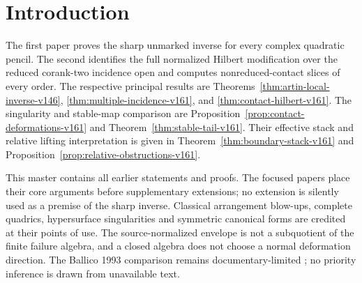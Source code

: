 \begin{abstract}
We prove that an unmarked, ungraded finite local algebra associated
with a complex quadratic pencil determines the pencil up to congruence.
The truncation order $n^2+2n-4$ is sharp, and no regularity assumption
is imposed. Multiplication recovers the first relation, its determinant
rulings, and the orientation that identifies the pencil coefficient
line. The construction extends to families over arbitrary complex
bases. On the effectively rigidified failure stack, the recovered
source carries a scalar-normalized apolar algebra bundle. The associated
multiple-incidence boundary admits explicit multi-Rees equations and
relative lifting conditions. The sharp inverse is proved independently
of this boundary application; its relative, covering, recognition,
and spectral extensions are retained in the appendices. The boundary application now includes formal
contact neighbourhoods and non-equidimensional Hilbert fibres, in the
explicitly effective deformation category. The paired geometry now includes ambient
versal contact coordinates, open Euclidean Hilbert charts with an exact
gcd collision law, and a non-equidimensional fibre with thick-line and
reduced-conic limits. The master preserves both complete mathematical
bodies and is not a third submission.
\end{abstract}
\maketitle
\section{Introduction}
\label{sec:introduction-v153}
The first paper proves the sharp unmarked inverse for every complex
quadratic pencil. The second identifies the full normalized Hilbert
modification over the reduced corank-two incidence open and computes
nonreduced-contact slices of every order. The respective principal
results are Theorems~\ref{thm:artin-local-inverse-v146},
\ref{thm:multiple-incidence-v161}, and
\ref{thm:contact-hilbert-v161}. The singularity and stable-map
comparison are Proposition~\ref{prop:contact-deformations-v161}
and Theorem~\ref{thm:stable-tail-v161}. Their effective stack and
relative lifting interpretation is given in
Theorem~\ref{thm:boundary-stack-v161} and
Proposition~\ref{prop:relative-obstructions-v161}.

This master contains all earlier statements and proofs. The focused
papers place their core arguments before supplementary extensions;
no extension is silently used as a premise of the sharp inverse.
Classical arrangement blow-ups, complete quadrics, hypersurface
singularities and symmetric canonical forms are credited at their
points of use. The source-normalized envelope is not a subquotient
of the finite failure algebra, and a closed algebra does not choose
a normal deformation direction. The Ballico 1993 comparison remains
documentary-limited \cite{Ballico93}; no priority inference is drawn
from unavailable text.

